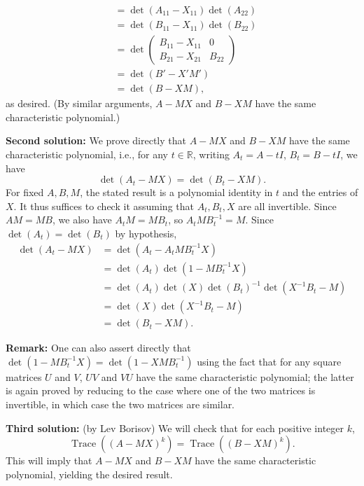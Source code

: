 \documentclass[amssymb,twocolumn,pra,10pt,aps]{revtex4-1}
\DeclareMathOperator{\Trace}{Trace}
\begin{document}
\begin{itemize}
\begin{align*}
&= \det(A_{11}-X_{11}) \det(A_{22}) \\
&= \det(B_{11}-X_{11}) \det(B_{22}) \\
&= \det \begin{pmatrix} B_{11}-X_{11} & 0 \\ B_{21}-X_{21} & B_{22} \end{pmatrix} \\
&= \det(B'-X'M') \\
&= \det(B-XM),
\end{align*}
as desired. (By similar arguments, $A-MX$ and $B-XM$ have the same characteristic polynomial.)

\noindent
\textbf{Second solution:}
We prove directly that $A-MX$ and $B-XM$ have the same characteristic polynomial, i.e., for any $t \in \mathbb{R}$, writing $A_t = A-tI$, $B_t = B-tI$, we have
\[
\det(A_t - MX) = \det(B_t - XM).
\]
For fixed $A,B,M$, the stated result is a polynomial identity in $t$ and the entries of $X$. It thus suffices to check it assuming that $A_t,B_t, X$ are all invertible.
Since $AM = MB$, we also have $A_t M = M B_t$, so $A_tMB_t^{-1} = M$.
Since $\det(A_t) = \det(B_t)$ by hypothesis,
\begin{align*}
\det(A_t - MX) &= \det (A_t - A_tM B_t^{-1} X)\\
&= \det(A_t) \det(1 - M B_t^{-1} X) \\
&= \det(A_t) \det(X) \det(B_t)^{-1} \det(X^{-1} B_t - M) \\
&= \det(X) \det(X^{-1} B_t - M) \\
&= \det(B_t - XM).
\end{align*}

\noindent
\textbf{Remark:}
One can also assert directly that
$\det(1 - M B_t^{-1} X) = \det(1 - X M B_t^{-1})$ using the fact that for any square matrices $U$ and $V$, $UV$ and $VU$ have the same characteristic polynomial; 
the latter is again proved by reducing to the case where one of the two matrices is invertible, in which case the two matrices are similar.

\noindent
\textbf{Third solution:}
(by Lev Borisov)
We will check that for each positive integer $k$,
\[
\Trace((A-MX)^k) = \Trace((B- XM)^k).
\]
This will imply that $A-MX$ and $B-XM$ have the same characteristic polynomial, yielding the desired result.


\end{itemize}
\end{document}
